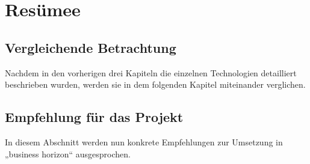 

\chapter{Resümee}
\section{Vergleichende Betrachtung}

Nachdem in den vorherigen drei Kapiteln die einzelnen Technologien detailliert beschrieben wurden, werden sie in dem folgenden Kapitel miteinander verglichen.


\section{Empfehlung für das Projekt}

In diesem Abschnitt werden nun konkrete Empfehlungen zur Umsetzung in „business horizon“ ausgesprochen.



